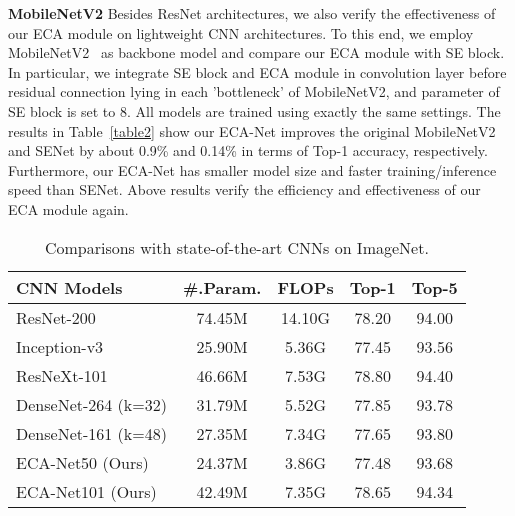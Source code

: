 \documentclass[10pt,twocolumn,letterpaper]{article}
\begin{document}
\noindent\textbf{MobileNetV2} Besides ResNet architectures, we also verify the effectiveness of our ECA module on lightweight CNN architectures. To this end, we employ MobileNetV2~\cite{DBLP:conf/cvpr/SandlerHZZC18} as backbone model and compare our ECA module with SE block. In particular, we integrate SE block and ECA module in convolution layer before residual connection lying in each 'bottleneck' of MobileNetV2, and parameter  of SE block is set to 8. All models are trained using exactly the same settings. The results in Table~\ref{table2} show our ECA-Net improves the original MobileNetV2 and SENet by about 0.9\% and 0.14\% in terms of Top-1 accuracy, respectively. Furthermore, our ECA-Net has smaller model size and faster training/inference speed than SENet. Above results verify the efficiency and effectiveness of our ECA module again.

\begin{table}[h]
	\centering
	\footnotesize
	\renewcommand{\arraystretch}{1.2}
	\begin{tabular}{l|c|c|c|c}
		\hline
		CNN Models & \#.Param. & FLOPs & Top-1 & Top-5\\
		\hline
		ResNet-200 & 74.45M & 14.10G & 78.20 & 94.00 \\
		Inception-v3  & 25.90M & 5.36G & 77.45 & 93.56 \\
		ResNeXt-101 & 46.66M & 7.53G & 78.80 & 94.40 \\
		DenseNet-264 (k=32) & 31.79M & 5.52G & 77.85 & 93.78 \\
		DenseNet-161 (k=48) & 27.35M & 7.34G & 77.65 & 93.80 \\
		\hline
		ECA-Net50 (Ours) & 24.37M & 3.86G & 77.48 & 93.68 \\
		ECA-Net101 (Ours) & 42.49M & 7.35G & 78.65 & 94.34 \\
		\hline
	\end{tabular}
	\smallskip
	\caption{Comparisons with state-of-the-art CNNs on ImageNet.}
	\label{table3:SOTA}
\end{table}
\end{document}
